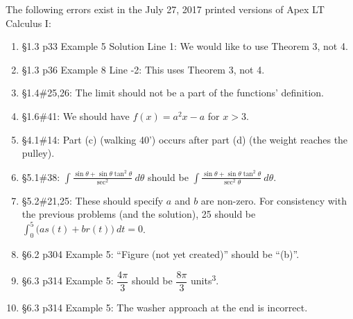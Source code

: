 \documentclass{amsart}
\newcommand{\ds}{\displaystyle}
\begin{document}
The following errors exist in the July 27, 2017 printed versions of Apex LT Calculus I:
\begin{enumerate}
\item \S1.3 p33 Example 5 Solution Line 1: We would like to use Theorem 3, not 4.
\item \S1.3 p36 Example 8 Line -2: This uses Theorem 3, not 4.
\item \S1.4\#25,26: The limit should not be a part of the functions' definition.
\item \S1.6\#41: We should have $f(x)=a^2x-a$ for $x>3$.
\item \S4.1\#14: Part (c) (walking 40') occurs after part (d) (the weight reaches the pulley).
\item \S5.1\#38: $\ds \int \frac{\sin\theta+\sin\theta\tan^2\theta}{\sec^2}\ d\theta$ should be $\ds \int \frac{\sin\theta+\sin\theta\tan^2\theta}{\sec^2\theta}\ d\theta$.
\item \S5.2\#21,25: These should specify $a$ and $b$ are non-zero.  For consistency with the previous problems (and the solution), 25 should be $\ds\int_0^5 \big(as(t)+br(t)\big) \ dt=0$.
\item \S6.2 p304 Example 5: ``Figure (not yet created)'' should be ``(b)''.
\item \S6.3 p314 Example 5: $\dfrac{4\pi}3$ should be $\dfrac{8\pi}3$ units\textsuperscript3.
\item \S6.3 p314 Example 5: The washer approach at the end is incorrect.
\label{2017-07-27Iplus}
\end{enumerate}

\clearpage
\end{document}

